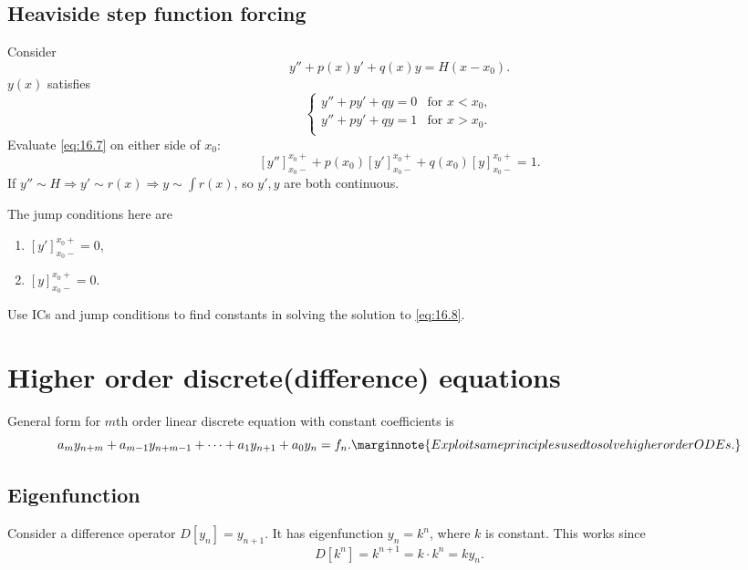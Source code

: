 \documentclass[10pt]{article}
\begin{document}
      \subsection{Heaviside step function forcing}
      Consider 
      \begin{equation}\label{eq:16.7}
        y''+p(x)y'+q(x)y=H(x-x_0).
      \end{equation}
      $y(x)$ satisfies
      \begin{equation}\label{eq:16.8}
        \begin{cases}
            y''+py'+qy=0 &\text{for }x<x_0,\\
            y''+py'+qy=1&\text{for }x>x_0.\\
          \end{cases}
      \end{equation}
      Evaluate \ref{eq:16.7} on either side of $x_0$:
          \[
            [y'']_{x_0-}^{x_0+}+p(x_0)[y']_{x_0-}^{x_0+}+q(x_0)[y]_{x_0-}^{x_0+}=1.
          \]
          If $ y'' \sim H \Rightarrow y' \sim r(x) \Rightarrow y\sim \int r(x) $, so $y',y$ are both continuous.

      The jump conditions here are 
      \begin{enumerate}
          \item $ [y']_{x_0-}^{x_0+}=0 $,
          \item $ [y]_{x_0-}^{x_0+}=0 $.
      \end{enumerate}
      Use ICs and jump conditions to find constants in solving the solution to \ref{eq:16.8}.
      \section{Higher order discrete(difference) equations}
      General form for $m$th order linear discrete equation with constant coefficients is
      \begin{equation}\label{eq:17.1}
          a_my_{n+m}+a_{m-1}y_{n+m-1}+\cdots+a_1y_{n+1}+a_0y_n=f_n.\marginnote{Exploit same principles used to solve higher order ODEs.}
      \end{equation}
      \subsection{Eigenfunction}
      Consider a difference operator $D[y_n]=y_{n+1}$. It has eigenfunction $ y_n=k^n $, where $k$ is constant. This works since 
      \[
          D[k^n]=k^{n+1}=k\cdot k^n= ky_n
      .\]
\end{document}
